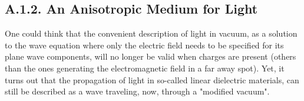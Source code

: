 \documentclass[11pt, a4paper, twoside]{article} %
\begin{document}
\subsection*{A.1.2. An Anisotropic Medium for Light\vspace{-0.2cm}}
One could think that the convenient description of light in vacuum, as a solution to the wave equation where only the electric field needs to be specified for its plane wave components, will no longer be valid when charges are present (others than the ones generating the electromagnetic field in a far away spot). Yet, it turns out that the propagation of light in so-called linear dielectric materials, can still be described as a wave traveling, now, through a "modified vacuum". 
\end{document}
